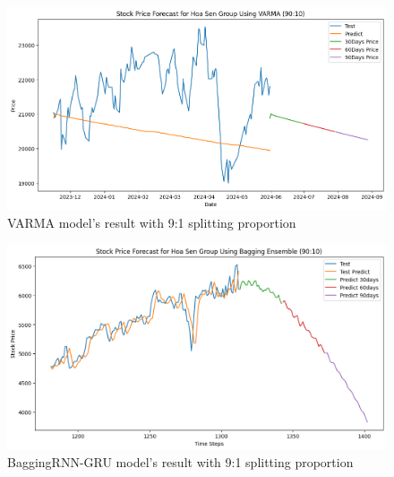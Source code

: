 \documentclass{ieeeojies}
\begin{document}
\begin{figure}[H]
  \centering
  \begin{minipage}{0.8\linewidth}
    \centering
    \includegraphics[width=\linewidth]{bibliography/VARMA_HSG_90-10.png}
    \caption{VARMA model's result with 9:1 splitting proportion}
    \label{fig17}
  \end{minipage}
\end{figure}
\begin{figure}[H]
  \centering
  \begin{minipage}{0.8\linewidth}
    \centering
    \includegraphics[width=\linewidth]{bibliography/Bagging_HSG.png}
    \caption{BaggingRNN-GRU model's result with 9:1 splitting proportion}
    \label{fig18}
  \end{minipage}
\end{figure}
\end{document}
